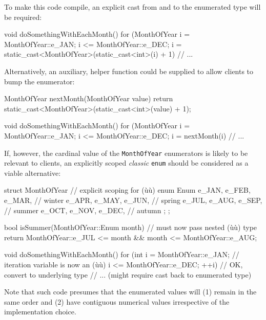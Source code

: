 \noindent To make this code compile, an explicit cast from and to the enumerated
type will be required:

\begin{emcppslisting}
void doSomethingWithEachMonth()
{
    for (MonthOfYear i =  MonthOfYear::e_JAN;
                     i <= MonthOfYear::e_DEC;
                     i = static_cast<MonthOfYear>(static_cast<int>(i) + 1)
    {
        // ...
    }
}
\end{emcppslisting}

\noindent Alternatively, an auxiliary, helper function could be supplied to allow
clients to bump the enumerator:

\begin{emcppslisting}
MonthOfYear nextMonth(MonthOfYear value)
{
    return static_cast<MonthOfYear>(static_cast<int>(value) + 1);
}

void doSomethingWithEachMonth()
{
    for (MonthOfYear i =  MonthOfYear::e_JAN;
                     i <= MonthOfYear::e_DEC;
                     i = nextMonth(i)
    {
        // ...
    }
}
\end{emcppslisting}

\noindent If, however, the cardinal value of the \texttt{MonthOfYear} enumerators
is likely to be relevant to clients, an explicitly scoped \emph{classic}
\texttt{enum} should be considered as a viable alternative:

\begin{emcppslisting}
struct MonthOfYear  // explicit scoping for (ù{}ù)
{
    enum Enum
    {
        e_JAN, e_FEB, e_MAR,  // winter
        e_APR, e_MAY, e_JUN,  // spring
        e_JUL, e_AUG, e_SEP,  // summer
        e_OCT, e_NOV, e_DEC,  // autumn
    };
};

bool isSummer(MonthOfYear::Enum month)  // must now pass nested (ù{}ù) type
{
    return MonthOfYear::e_JUL <= month && month <= MonthOfYear::e_AUG;
}

void doSomethingWithEachMonth()
{
    for (int i =  MonthOfYear::e_JAN;  // iteration variable is now an (ù{}ù)
             i <= MonthOfYear::e_DEC;
           ++i)  // OK, convert to underlying type
    {
        // ... (might require cast back to enumerated type)
    }
}
\end{emcppslisting}

\noindent Note that such code presumes that the enumerated values will (1) remain
in the same order and (2) have contiguous numerical values irrespective
of the implementation choice.

